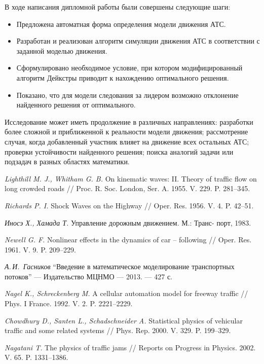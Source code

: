 \documentclass[12pt, a4paper]{article}
\begin{document}
В ходе написания дипломной работы были совершены следующие шаги:

\begin{itemize}
	\item Предложена автоматная форма определения модели движения АТС.
	\item Разработан и реализован алгоритм симуляции движения АТС в соответствии с заданной моделью движения.
	\item Сформулировано необходимое условие, при котором модифицированный алгоритм Дейкстры приводит к нахождению оптимального решения.
	\item Показано, что для модели следования за лидером возможно отклонение найденного решения от оптимального.
\end{itemize}

Исследование может иметь продолжение в различных направлениях: разработки более сложной и приближенной к реальности модели движения; рассмотрение случая, когда добавленный участник влияет на движение всех остальных АТС; проверки устойчивости найденного решения; поиска аналогий задачи или подзадач в разных областях математики.
\newpage
\begin{thebibliography}{0}
	
	
	 \textit{Lighthill M. J., Whitham G. B.} On kinematic waves: II. Theory of traffic
	flow on long crowded roads // Proc. R. Soc. London, Ser. A. 1955.
	V. 229. P. 281–345.
	
	 \textit{Richards P. I.} Shock Waves on the Highway // Oper. Res. 1956. V. 4.
	P. 42–51.
	
	 \textit{Иносэ Х., Хамада Т.} Управление дорожным движением. М.: Транс-
	порт, 1983.
	
	 \textit{Newell G. F.} Nonlinear effects in the dynamics of car – following //
	Oper. Res. 1961. V. 9. P. 209–229.
	
	 \textit{А.\,И.~Гасников} ``Введение в математическое моделирование транспортных потоков'' --- Издательство МЦНМО --- 2013. --- 427 с.
	
	 \textit{Nagel K., Schreckenberg M.} A cellular automation model for freeway
	traffic // Phys. I France. 1992. V. 2. P. 2221–2229.
	
	 \textit{Chowdhury D., Santen L., Schadschneider A.} Statistical physics of vehicular
	traffic and some related systems // Phys. Rep. 2000. V. 329.
	P. 199–329.
	
	 \textit{Nagatani T.} The physics of traffic jams // Reports on Progress in Physics.
	2002. V. 65. P. 1331–1386.
	
\end{thebibliography} 
\end{document}
